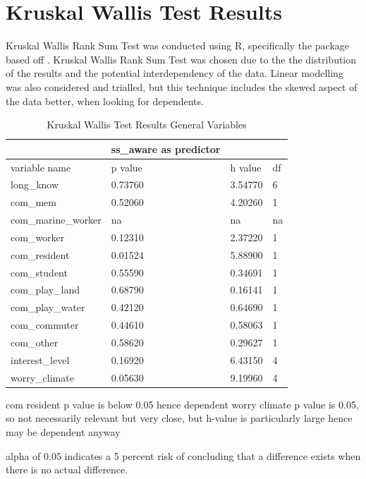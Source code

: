 \section{Kruskal Wallis Test Results}
Kruskal Wallis Rank Sum Test was conducted using R, specifically the package based off \cite{hollander_nonparametric_2014}. Kruskal Wallis Rank Sum Test was chosen due to the the distribution of the results and the potential interdependency of the data. Linear modelling was also considered and trialled, but this technique includes the skewed aspect of the data better, when looking for dependents. 
\begin{table}[h]
    \centering
    \begin{tabular}{|l|l|l|l|}
    \hline
         ~ & ss\_aware as predictor & ~ & ~ \\ \hline
        variable name & p value & h value & df \\ \hline
           long\_know & 0.73760 & 3.54770 & 6 \\ \hline
        com\_mem & 0.52060 & 4.20260 & 1 \\ \hline
        com\_marine\_worker & na & na & na \\ \hline
        com\_worker & 0.12310 & 2.37220 & 1 \\ \hline
        com\_resident & \cellcolor[HTML]{7df9ff} 0.01524 & 5.88900 & 1 \\ \hline
        com\_student & 0.55590 & 0.34691 & 1 \\ \hline
        com\_play\_land & 0.68790 & 0.16141 & 1 \\ \hline
        com\_play\_water & 0.42120 & 0.64690 & 1 \\ \hline
        com\_commuter & 0.44610 & 0.58063 & 1 \\ \hline
        com\_other & 0.58620 & 0.29627 & 1 \\ \hline
        interest\_level & 0.16920 & 6.43150 & 4 \\ \hline
        worry\_climate & 0.05630 & 9.19960 & 4 \\ \hline
    \end{tabular}
    \caption{Kruskal Wallis Test Results General Variables}
    \label{Kruskal_wallis_test_general}
\end{table}
com resident p value is below 0.05 hence dependent
worry climate p value is 0.05, so not necessarily relevant but very close, but h-value is particularly large hence may be dependent anyway

alpha of 0.05 indicates a 5 percent
risk of concluding that a difference exists when there is no actual difference.

